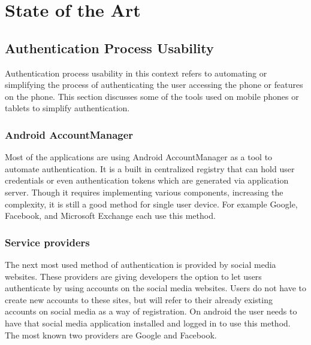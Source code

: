 
\chapter{State of the Art} %




\ifpdf
    \graphicspath{{X/figures/PNG/}{X/figures/PDF/}{X/figures/}}
\else
    \graphicspath{{X/figures/EPS/}{X/figures/}}
\fi



\section{Authentication Process Usability}
Authentication process usability in this context refers to automating or simplifying the process of authenticating the user accessing the phone or features on the phone. This section discusses some of the tools used on mobile phones or tablets to simplify authentication.

\subsection{Android AccountManager}
Most of the applications are using Android AccountManager as a tool to automate authentication. It is a built in centralized registry that can hold user credentials or even authentication tokens which are generated via application server. Though it requires implementing various components, increasing the complexity, it is still a good method for single user device. For example Google, Facebook, and Microsoft Exchange each use this method. \cite{accountmanager}

\subsection{Service providers}
The next most used method of authentication is provided by social media websites. These providers are giving developers the option to let users authenticate by using accounts on the social media websites. Users do not have to create new accounts to these sites, but will refer to their already existing accounts on social media as a way of registration. On android the user needs to have that social media application installed and logged in to use this method. The most known two providers are Google and Facebook.

